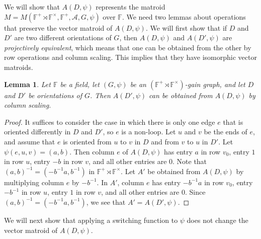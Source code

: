 \documentclass[12pt]{article}
\newtheorem{lemma}[theorem]{Lemma}
\theoremstyle{definition}
\newcommand{\bF}{\mathbb F}
\newcommand{\cA}{\mathcal{A}}
\begin{document}
We will show that $A(D, \psi)$ represents the matroid $M = M(\bF^{+} \rtimes \bF^{\times}, \bF^+, \cA, G, \psi)$ over $\bF$.
We need two lemmas about operations that preserve the vector matroid of $A(D, \psi)$.
We will first show that if $D$ and $D'$ are two different orientations of $G$, then $A(D, \psi)$ and $A(D', \psi)$ are \emph{projectively equivalent}, which means that one can be obtained from the other by row operations and column scaling.
This implies that they have isomorphic vector matroids.
 

\begin{lemma} \label{lem: reorientation and projective equivalence}
Let $\bF$ be a field, let $(G, \psi)$ be an $(\bF^{+} \rtimes \bF^{\times})$-gain graph, and let $D$ and $D'$ be orientations of $G$.
Then $A(D', \psi)$ can be obtained from $A(D, \psi)$ by column scaling.
\end{lemma}
\begin{proof}
It suffices to consider the case in which there is only one edge $e$ that is oriented differently in $D$ and $D'$, so $e$ is a non-loop.
Let $u$ and $v$ be the ends of $e$, and assume that $e$ is oriented from $u$ to $v$ in $D$ and from $v$ to $u$ in $D'$.
Let $\psi(e, u, v) = (a, b)$.
Then column $e$ of $A(D, \psi)$ has entry $a$ in row $v_0$, entry $1$ in row $u$, entry $-b$ in row $v$, and all other entries are $0$.
Note that $(a, b)^{-1} = (-b^{-1}a, b^{-1})$ in $\bF^+ \rtimes \bF^{\times}$.
Let $A'$ be obtained from $A(D, \psi)$ by multiplying column $e$ by $-b^{-1}$.
In $A'$, column $e$ has entry $-b^{-1}a$ in row $v_0$, entry $-b^{-1}$ in row $u$, entry $1$ in row $v$, and all other entries are $0$.
Since $(a, b)^{-1} = (-b^{-1}a, b^{-1})$, we see that $A' = A(D', \psi)$.
\end{proof}


We will next show that applying a switching function to $\psi$ does not change the vector matroid of $A(D, \psi)$.
\end{document}
